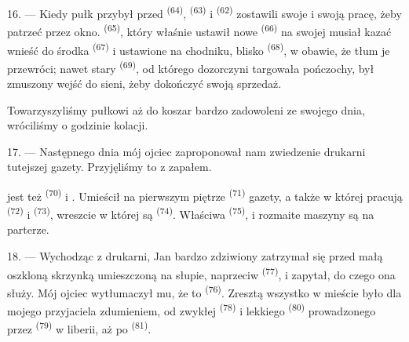 16. --- Kiedy pułk przybył przed  \textsuperscript{(64)},
 \textsuperscript{(63)} i  \textsuperscript{(62)}
zostawili swoje  i swoją pracę, żeby patrzeć przez okno.
 \textsuperscript{(65)}, który właśnie ustawił nowe 
\textsuperscript{(66)} na swojej  musiał kazać wnieść do środka
 \textsuperscript{(67)} i  ustawione na chodniku, blisko
 \textsuperscript{(68)}, w obawie, że tłum je przewróci; nawet
stary  \textsuperscript{(69)}, od którego dozorczyni targowała
pończochy, był zmuszony wejść do sieni, żeby dokończyć swoją sprzedaż.

Towarzyszyliśmy pułkowi aż do koszar  bardzo zadowoleni ze swojego dnia,
wróciliśmy o godzinie kolacji.

\VUsaut{3.0mm}

17. --- Następnego dnia mój ojciec zaproponował nam zwiedzenie drukarni tutejszej
gazety. Przyjęliśmy to z zapałem.

 jest też  \textsuperscript{(70)}
   i
. Umieścił na pierwszym piętrze 
\textsuperscript{(71)} gazety, a także  w której pracują
 \textsuperscript{(72)} i 
\textsuperscript{(73)}, wreszcie  w której są 
\textsuperscript{(74)}. Właściwa  \textsuperscript{(75)},
 i rozmaite maszyny są na parterze.

\VUsaut{3.0mm}

18. --- Wychodząc z drukarni, Jan bardzo zdziwiony zatrzymał się przed małą oszkloną
skrzynką umieszczoną na słupie, naprzeciw 
\textsuperscript{(77)}, i zapytał, do czego ona służy. Mój ojciec wytłumaczył mu, że to
 \textsuperscript{(76)}. Zresztą wszystko w mieście było dla
mojego przyjaciela zdumieniem, od zwykłej 
\textsuperscript{(78)} i lekkiego 
\textsuperscript{(80)} prowadzonego przez  \textsuperscript{(79)} w liberii,
aż po  \textsuperscript{(81)}.

